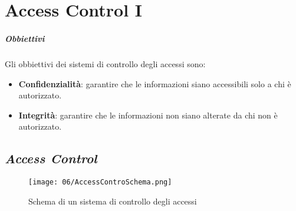 \chapter{Access Control I}
\label{chap:accessControl}
\thispagestyle{chapterInit}

\paragraph{Obbiettivi} Gli obbiettivi dei sistemi di controllo degli accessi sono:
    \begin{itemize}
        \item \textbf{Confidenzialità}: garantire che le informazioni siano accessibili solo a chi è autorizzato.
        \item \textbf{Integrità}: garantire che le informazioni non siano alterate da chi non è autorizzato.
    \end{itemize}

\section{\textit{Access Control}}
    \begin{figure}[H]
        \label{fig:accessControlSchema}
        \centering
        \texttt{[image: 06/AccessControSchema.png]}
        \caption{Schema di un sistema di controllo degli accessi}
    \end{figure}

